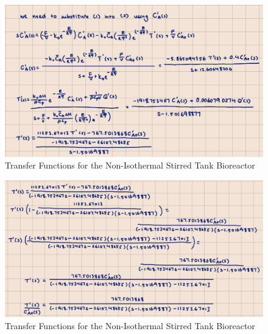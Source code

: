 \documentclass[12pt]{article}
\begin{document}
\begin{enumerate}
\begin{enumerate}
    \begin{figure}[H]
      \centering
      \includegraphics[width=\textwidth]{Figures/handcalc/figure4-4b.png}
      \caption{Transfer Functions for the Non-Isothermal Stirred Tank Bioreactor}
      \label{fig:figure46}
    \end{figure}

    \begin{figure}[H]
      \centering
      \includegraphics[width=\textwidth]{Figures/handcalc/figure4-4c.png}
      \caption{Transfer Functions for the Non-Isothermal Stirred Tank Bioreactor}
      \label{fig:figure47}
    \end{figure}


\end{enumerate}
\end{enumerate}
\end{document}
